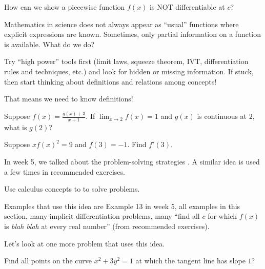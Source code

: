 \documentclass[../main.tex]{subfiles}
\begin{document}
  \faComment{} How can we show a piecewise function \(f(x)\) is NOT differentiable at \(c\)?

  Mathematics in science does not always appear as ``usual'' functions where explicit expressions are known. Sometimes, only partial information on a function is available. What do we do?

  \begin{mdframed}[style=simple-compact]
    Try ``high power'' tools first (limit laws, squeeze theorem, IVT, differentiation rules and techniques, etc.) and look for hidden or missing information. If stuck, then start thinking about definitions and relations among concepts!

    That means we need to know definitions!
  \end{mdframed}

  \begin{example}
    Suppose \(f(x) = \frac{g(x) + 3}{x+1}\).  If \(\lim_{x \to 2} f(x) = 1\) and \(g(x)\) is continuous at \(2\), what is \(g(2)\)?
  \end{example}

  \begin{example}
    Suppose \(xf(x)^{2} = 9\) and \(f(3) = -1\). Find \(f'(3)\).

  \end{example}
  \clearpage

  In week 5, we talked about the problem-solving strategies . A similar idea is used a few times in recommended exercises.
  \begin{mdframed}[style=simple-compact] \label{strategy:formulate-equation}
    Use calculus concepts to  to solve problems.
  \end{mdframed}

  Examples that use this idea are Example 13 in week 5, all examples in this section, many implicit differentiation problems, many ``find all \(c\) for which \(f(x)\) is \emph{blah blah} at every real number'' (from recommended exercises).

  Let's look at one more problem that uses this idea. 

  \begin{example}
    Find all points on the curve \(x^{2} + 3y^{2} = 1\) at which the tangent line has slope \(1\)?
    
  \end{example}
\end{document}
